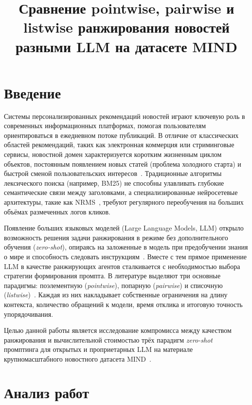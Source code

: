 \documentclass{misisarticle}
\title{Сравнение pointwise, pairwise и listwise ранжирования новостей разными LLM на датасете MIND}
\begin{document}
\maketitle

\section{Введение}

Системы персонализированных рекомендаций новостей играют ключевую роль в современных информационных платформах, помогая пользователям ориентироваться в ежедневном потоке публикаций. В отличие от классических областей рекомендаций, таких как электронная коммерция или стриминговые сервисы, новостной домен характеризуется коротким жизненным циклом объектов, постоянным появлением новых статей (проблема холодного старта) и быстрой сменой пользовательских интересов~\cite{wu2020mind}. Традиционные алгоритмы лексического поиска (например, BM25) не способны улавливать глубокие семантические связи между заголовками, а специализированные нейросетевые архитектуры, такие как NRMS~\cite{wu2019nrms}, требуют регулярного переобучения на больших объёмах размеченных логов кликов.

Появление больших языковых моделей (Large Language Models, LLM) открыло возможность решения задачи ранжирования в режиме без дополнительного обучения (\textit{zero-shot}), опираясь на заложенные в модель при предобучении знания о мире и способность следовать инструкциям~\cite{zhang2025recommendation, sosedka2024telegram}. Вместе с тем прямое применение LLM в качестве ранжирующих агентов сталкивается с необходимостью выбора стратегии формирования промпта. В литературе выделяют три основные парадигмы: поэлементную (\textit{pointwise}), попарную (\textit{pairwise}) и списочную (\textit{listwise})~\cite{sun2023chatgpt, qin2024pairwise}. Каждая из них накладывает собственные ограничения на длину контекста, количество обращений к модели, время отклика и итоговую точность упорядочивания.

Целью данной работы является исследование компромисса между качеством ранжирования и вычислительной стоимостью трёх парадигм \textit{zero-shot} промптинга для открытых и проприетарных LLM на материале крупномасштабного новостного датасета MIND~\cite{wu2020mind}.

\section{Анализ работ}
\end{document}
